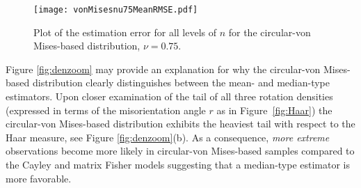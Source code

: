 \begin{figure}[h!]
\centering
\texttt{[image: vonMisesnu75MeanRMSE.pdf]}
\caption{Plot of the estimation error for all levels of $n$ for the circular-von Mises-based distribution,  $\nu=0.75$.  \label{fig:vmnu75}}
\end{figure}

\noindent Figure \ref{fig:denzoom} may provide an explanation for why the circular-von Mises-based distribution clearly distinguishes between the mean- and median-type estimators.  Upon closer examination of the tail of all three rotation densities (expressed in terms of the misorientation angle $r$ as in Figure~\ref{fig:Haar}) the circular-von Mises-based distribution exhibits the heaviest tail with respect to the Haar measure, see Figure \ref{fig:denzoom}(b). As a consequence, \textit{more extreme} observations become more likely in circular-von Mises-based samples compared to the Cayley and matrix Fisher models suggesting that a median-type estimator is more favorable. 



